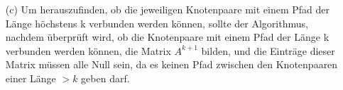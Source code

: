 \documentclass{scrartcl}
\begin{document}
\begin{enumerate}
\item[(c)] Um herauszufinden, ob die jeweiligen Knotenpaare mit 
einem Pfad der Länge höchstens k verbunden werden können, sollte 
der Algorithmus, nachdem überprüft wird, ob die Knotenpaare mit 
einem Pfad der Länge k verbunden werden können, die Matrix 
$A^{k+1}$ bilden, und die Einträge dieser Matrix müssen alle Null 
sein, da es keinen Pfad zwischen den Knotenpaaren einer Länge $>k$ 
geben darf.


\end{enumerate}
\end{document}
